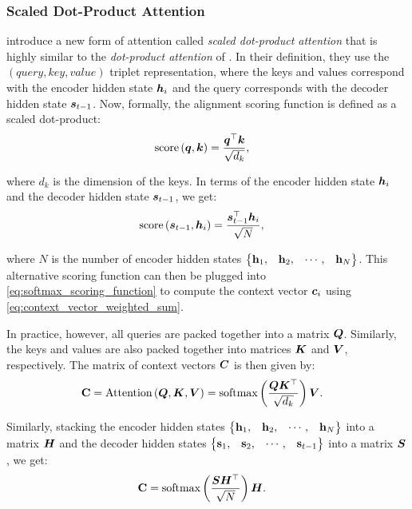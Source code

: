 \subsubsection{Scaled Dot-Product Attention}
\label{subsubsec:scaled_dot_product_attention}
\citet{vaswani2017attention} introduce a new form of attention called \emph{scaled dot-product attention} that is highly similar to the \emph{dot-product attention} of \citet{luong2015effective}. In their definition, they use the $(query, key, value)$ triplet representation, where the keys and values correspond with the encoder hidden state $\hvect_i$ and the query corresponds with the decoder hidden state $\svect_{t-1}$. Now, formally, the alignment scoring function is defined as a scaled dot-product:
\begin{align}
    \scoree{\vect{q}, \vect{k}} &= \frac{\vect{q}^{\top} \vect{k}}{\sqrt{d_k}},
\end{align}

where $d_k$ is the dimension of the keys. In terms of the encoder hidden state $\hvect_i$ and the decoder hidden state $\svect_{t-1}$, we get:
\begin{align}
    \label{eq:scaled_dot_product_scoring_function}
    \scoree{\svect_{t-1}, \hvect_i} &= \frac{\svect_{t-1}^{\top} \hvect_i}{\sqrt{N}},
\end{align}

where $N$ is the number of encoder hidden states $\begin{Bmatrix} \hvect_1, & \hvect_2, & \cdots, & \hvect_N \end{Bmatrix}$. This alternative scoring function can then be plugged into \cref{eq:softmax_scoring_function} to compute the context vector $\cvect_i$ using \cref{eq:context_vector_weighted_sum}.

In practice, however, all queries are packed together into a matrix $\vect{Q}$. Similarly, the keys and values are also packed together into matrices $\vect{K}$ and $\vect{V}$, respectively. The matrix of context vectors $\vect{C}$ is then given by:
\begin{align}
    \vect{C} &=  \text{Attention}\left( \vect{Q}, \vect{K}, \vect{V} \right) = \text{softmax}\left( \frac{\vect{Q} \vect{K}^{\top}}{\sqrt{d_k}} \right) \vect{V}.
\end{align}

Similarly, stacking the encoder hidden states  $\begin{Bmatrix} \hvect_1, & \hvect_2, & \cdots, & \hvect_N \end{Bmatrix}$ into a matrix $\vect{H}$ and the decoder hidden states  $\begin{Bmatrix} \svect_1, & \svect_2, & \cdots, & \svect_{t-1} \end{Bmatrix}$ into a matrix $\vect{S}$, we get:
\begin{align}
    \vect{C} &= \text{softmax}\left( \frac{\vect{S} \vect{H}^{\top}}{\sqrt{N}} \right) \vect{H}.
\end{align}


